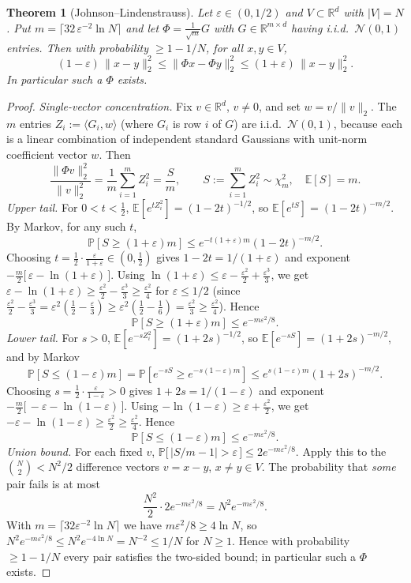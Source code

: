 \documentclass{amsart}
\newtheorem{theorem}{Theorem}
\newcommand{\R}{\mathbb{R}}
\newcommand{\E}{\mathbb{E}}
\renewcommand{\Pr}{\mathbb{P}}
\newcommand{\eps}{\varepsilon}
\begin{document}
\begin{theorem}[Johnson--Lindenstrauss]\label{thm:jl}
Let $\eps\in(0,1/2)$ and $V\subset\R^d$ with $|V|=N$.  Put
$m=\big\lceil 32\,\eps^{-2}\ln N\big\rceil$ and let $\Phi=\frac{1}{\sqrt m}G$ with
$G\in\R^{m\times d}$ having i.i.d.\ $\mathcal N(0,1)$ entries.  Then with probability
$\ge 1-1/N$, for all $x,y\in V$,
\[
(1-\eps)\,\|x-y\|_2^2 \le \|\Phi x-\Phi y\|_2^2 \le (1+\eps)\,\|x-y\|_2^2 .
\]
In particular such a $\Phi$ exists.
\end{theorem}
\begin{proof}
\emph{Single-vector concentration.}  Fix $v\in\R^d$, $v\ne 0$, and set
$w=v/\|v\|_2$.  The $m$ entries $Z_i:=\langle G_i,w\rangle$ (where $G_i$ is row $i$ of
$G$) are i.i.d.\ $\mathcal N(0,1)$, because each is a linear combination of independent
standard Gaussians with unit-norm coefficient vector $w$.  Then
\[
\frac{\|\Phi v\|_2^2}{\|v\|_2^2}=\frac1m\sum_{i=1}^m Z_i^2=\frac{S}{m},
\qquad S:=\sum_{i=1}^m Z_i^2\sim\chi^2_m,\quad \E[S]=m .
\]
\emph{Upper tail.}  For $0<t<\tfrac12$, $\E[e^{tZ_i^2}]=(1-2t)^{-1/2}$, so
$\E[e^{tS}]=(1-2t)^{-m/2}$.  By Markov, for any such $t$,
\[
\Pr[S\ge(1+\eps)m]\le e^{-t(1+\eps)m}(1-2t)^{-m/2}.
\]
Choosing $t=\tfrac12\cdot\tfrac{\eps}{1+\eps}\in(0,\tfrac12)$ gives $1-2t=1/(1+\eps)$
and exponent $-\tfrac m2\big[\,\eps-\ln(1+\eps)\,\big]$.  Using
$\ln(1+\eps)\le \eps-\tfrac{\eps^2}{2}+\tfrac{\eps^3}{3}$, we get
$\eps-\ln(1+\eps)\ge \tfrac{\eps^2}{2}-\tfrac{\eps^3}{3}\ge \tfrac{\eps^2}{4}$ for
$\eps\le 1/2$ (since $\tfrac{\eps^2}{2}-\tfrac{\eps^3}{3}=\eps^2(\tfrac12-\tfrac\eps3)
\ge\eps^2(\tfrac12-\tfrac16)=\tfrac{\eps^2}{3}\ge\tfrac{\eps^2}{4}$).  Hence
\[
\Pr[S\ge(1+\eps)m]\le e^{-m\eps^2/8}.
\]
\emph{Lower tail.}  For $s>0$, $\E[e^{-sZ_i^2}]=(1+2s)^{-1/2}$, so
$\E[e^{-sS}]=(1+2s)^{-m/2}$, and by Markov
\[
\Pr[S\le(1-\eps)m]=\Pr[e^{-sS}\ge e^{-s(1-\eps)m}]
\le e^{s(1-\eps)m}(1+2s)^{-m/2}.
\]
Choosing $s=\tfrac12\cdot\tfrac{\eps}{1-\eps}>0$ gives $1+2s=1/(1-\eps)$ and exponent
$-\tfrac m2\big[\,-\eps-\ln(1-\eps)\,\big]$.  Using
$-\ln(1-\eps)\ge \eps+\tfrac{\eps^2}{2}$, we get
$-\eps-\ln(1-\eps)\ge \tfrac{\eps^2}{2}\ge\tfrac{\eps^2}{4}$.  Hence
\[
\Pr[S\le(1-\eps)m]\le e^{-m\eps^2/8}.
\]
\emph{Union bound.}  For each fixed $v$,
$\Pr\big[\,|S/m-1|>\eps\,\big]\le 2e^{-m\eps^2/8}$.  Apply this to the
$\binom N2<N^2/2$ difference vectors $v=x-y$, $x\neq y\in V$.  The probability that
\emph{some} pair fails is at most
\[
\frac{N^2}{2}\cdot 2e^{-m\eps^2/8}=N^2 e^{-m\eps^2/8}.
\]
With $m=\lceil 32\eps^{-2}\ln N\rceil$ we have $m\eps^2/8\ge 4\ln N$, so
$N^2 e^{-m\eps^2/8}\le N^2 e^{-4\ln N}=N^{-2}\le 1/N$ for $N\ge 1$.  Hence with
probability $\ge 1-1/N$ every pair satisfies the two-sided bound; in particular such a
$\Phi$ exists.
\end{proof}
\end{document}
